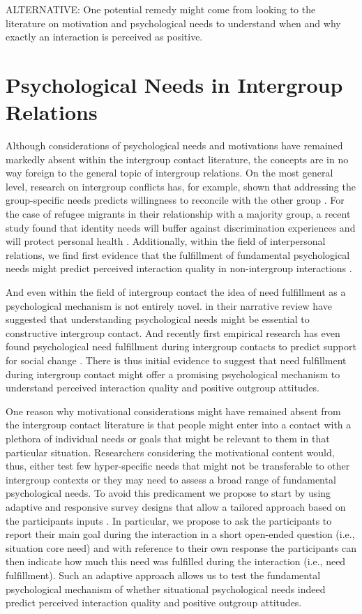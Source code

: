 \documentclass[man, 12pt, a4paper]{apa7}
\theoremstyle{break}
\theoremstyle{plain}
\begin{document}
ALTERNATIVE: One potential remedy might come from looking to the literature on motivation and psychological needs to understand when and why exactly an interaction is perceived as positive. 

\section{Psychological Needs in Intergroup Relations}
Although considerations of psychological needs and motivations have remained markedly absent within the intergroup contact literature, the concepts are in no way foreign to the general topic of intergroup relations. On the most general level, research on intergroup conflicts has, for example, shown that addressing the group-specific needs predicts willingness to reconcile with the other group \citep[][]{Shnabel2008}. For the case of refugee migrants in their relationship with a majority group, a recent study found that identity needs will buffer against discrimination experiences and will protect personal health \citep[][]{Celebi2017}. Additionally, within the field of interpersonal relations, we find first evidence that the fulfillment of fundamental psychological needs might predict perceived interaction quality in non-intergroup interactions \citep[][]{Downie2008}. 

And even within the field of intergroup contact the idea of need fulfillment as a psychological mechanism is not entirely novel. \citet{Dovidio2017} in their narrative review have suggested that understanding psychological needs might be essential to constructive intergroup contact. And recently first empirical research has even found psychological need fulfillment during intergroup contacts to predict support for social change  \citep[][]{Hassler2021}. There is thus initial evidence to suggest that need fulfillment during intergroup contact might offer a promising psychological mechanism to understand perceived interaction quality and positive outgroup attitudes. 

One reason why motivational considerations might have remained absent from the intergroup contact literature is that people might enter into a contact with a plethora of individual needs or goals that might be relevant to them in that particular situation. Researchers considering the motivational content would, thus, either test few hyper-specific needs that might not be transferable to other intergroup contexts or they may need to assess a broad range of fundamental psychological needs. To avoid this predicament we propose to start by using adaptive and responsive survey designs that allow a tailored approach based on the participants inputs \citep[e.g.,][]{Tourangeau2017}. In particular, we propose to ask the participants to report their main goal during the interaction in a short open-ended question (i.e., situation core need) and with reference to their own response the participants can then indicate how much this need was fulfilled during the interaction (i.e., need fulfillment). Such an adaptive approach allows us to test the fundamental psychological mechanism of whether situational psychological needs indeed predict perceived interaction quality and positive outgroup attitudes. 
\end{document}
